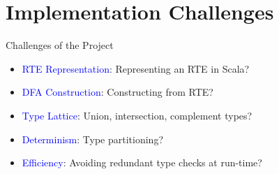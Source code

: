 \section{Implementation Challenges}

{  %
\begin{frame}{Challenges of the Project}
  \begin{itemize}
  \item {} \textcolor{blue}{RTE Representation}:   Representing an RTE in Scala?
  \item {} \textcolor{blue}{DFA Construction}:  Constructing from RTE?
  \item {} \textcolor{blue}{Type Lattice}: Union, intersection, complement types?
  \item {} \textcolor{blue}{Determinism}: Type partitioning?
  \item {} \textcolor{blue}{Efficiency}:  Avoiding redundant type checks at run-time?
  \end{itemize}
\end{frame}
}

